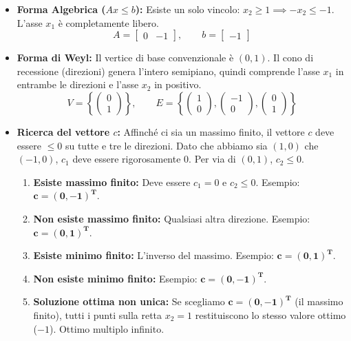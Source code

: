 \documentclass[12pt, a4paper]{article}
\begin{document}
	\begin{itemize}[label=\textcolor{titlecolor}{\Large\textbullet}, itemsep=4pt, leftmargin=1.5cm]
		\item \textbf{Forma Algebrica ($Ax \leq b$):} Esiste un solo vincolo: $x_2 \geq 1 \implies -x_2 \leq -1$. L'asse $x_1$ è completamente libero.
		\[
		A = \begin{bmatrix} 0 & -1 \end{bmatrix}, \qquad b = \begin{bmatrix} -1 \end{bmatrix}
		\]
		\item \textbf{Forma di Weyl:} Il vertice di base convenzionale è $(0,1)$. Il cono di recessione (direzioni) genera l'intero semipiano, quindi comprende l'asse $x_1$ in entrambe le direzioni e l'asse $x_2$ in positivo.
		\[
		V = \left\{ \begin{pmatrix} 0 \\ 1 \end{pmatrix} \right\}, \qquad E = \left\{ \begin{pmatrix} 1 \\ 0 \end{pmatrix}, \begin{pmatrix} -1 \\ 0 \end{pmatrix}, \begin{pmatrix} 0 \\ 1 \end{pmatrix} \right\}
		\]
		\item \textbf{Ricerca del vettore $c$:} Affinché ci sia un massimo finito, il vettore $c$ deve essere $\leq 0$ su tutte e tre le direzioni. Dato che abbiamo sia $(1,0)$ che $(-1,0)$, $c_1$ deve essere rigorosamente $0$. Per via di $(0,1)$, $c_2 \leq 0$.
		\begin{enumerate}[label=\alph*)]
			\item \textbf{Esiste massimo finito:} Deve essere $c_1=0$ e $c_2 \leq 0$. Esempio: $\mathbf{c = (0, -1)^T}$.
			\item \textbf{Non esiste massimo finito:} Qualsiasi altra direzione. Esempio: $\mathbf{c = (0, 1)^T}$.
			\item \textbf{Esiste minimo finito:} L'inverso del massimo. Esempio: $\mathbf{c = (0, 1)^T}$.
			\item \textbf{Non esiste minimo finito:} Esempio: $\mathbf{c = (0, -1)^T}$.
			\item \textbf{Soluzione ottima non unica:} Se scegliamo $\mathbf{c = (0, -1)^T}$ (il massimo finito), tutti i punti sulla retta $x_2=1$ restituiscono lo stesso valore ottimo ($-1$). Ottimo multiplo infinito.
		\end{enumerate}
	\end{itemize}
	
\end{document}
